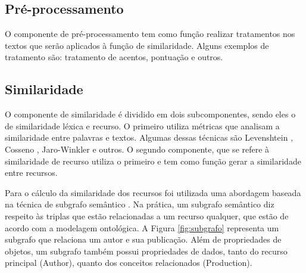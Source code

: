 \subsection{Pré-processamento}
O componente de pré-processamento tem como função realizar tratamentos nos textos que serão aplicados à função de similaridade. Alguns exemplos de tratamento são: tratamento de acentos, pontuação e outros.

\subsection{Similaridade}
O componente de similaridade é dividido em dois subcomponentes, sendo eles o de similaridade léxica e recurso. O primeiro utiliza métricas que analisam a similaridade entre palavras e textos. Algumas dessas técnicas são Levenshtein \cite{levenshtein1966binary}, Cosseno \cite{singhal2001modern}, Jaro-Winkler \cite{winkler1990string} e outros. O segundo componente, que se refere à similaridade de recurso utiliza o primeiro e tem como função gerar a similaridade entre recursos.

Para o cálculo da similaridade dos recursos foi utilizada uma abordagem baseada na técnica de subgrafo semântico \cite{wang2008lily}. Na prática, um subgrafo semântico diz respeito às triplas que estão relacionadas a um recurso qualquer, que estão de acordo com a modelagem ontológica. A Figura \ref{fig:subgrafo} representa um subgrafo que relaciona um autor e sua publicação. Além de propriedades de objetos, um subgrafo também possui propriedades de dados, tanto do recurso principal (Author), quanto dos conceitos relacionados (Production). %




